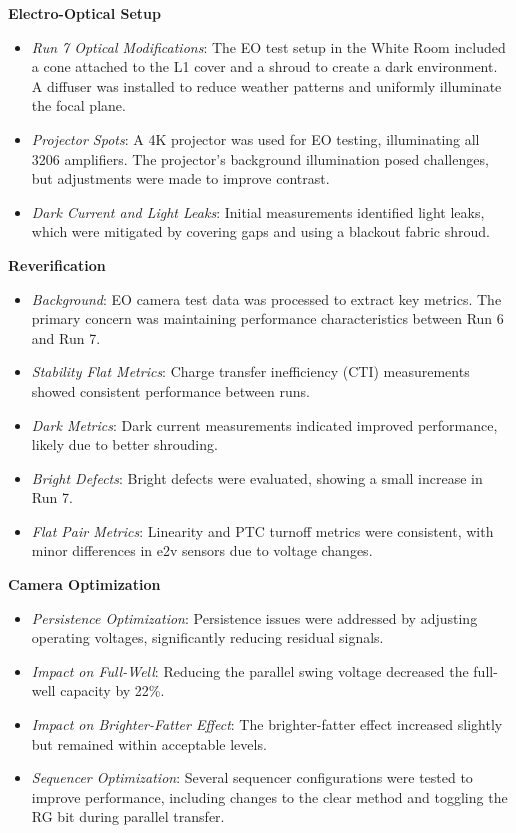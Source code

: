 \textbf{Electro-Optical Setup} \\
\begin{itemize}
    \item \textit{Run 7 Optical Modifications}: The EO test setup in the White Room included a cone attached to the L1 cover and a shroud to create a dark environment. A diffuser was installed to reduce weather patterns and uniformly illuminate the focal plane.
    \item \textit{Projector Spots}: A 4K projector was used for EO testing, illuminating all 3206 amplifiers. The projector's background illumination posed challenges, but adjustments were made to improve contrast.
    \item \textit{Dark Current and Light Leaks}: Initial measurements identified light leaks, which were mitigated by covering gaps and using a blackout fabric shroud.
\end{itemize}

\textbf{Reverification} \\
\begin{itemize}
    \item \textit{Background}: EO camera test data was processed to extract key metrics. The primary concern was maintaining performance characteristics between Run 6 and Run 7.
    \item \textit{Stability Flat Metrics}: Charge transfer inefficiency (CTI) measurements showed consistent performance between runs.
    \item \textit{Dark Metrics}: Dark current measurements indicated improved performance, likely due to better shrouding.
    \item \textit{Bright Defects}: Bright defects were evaluated, showing a small increase in Run 7.
    \item \textit{Flat Pair Metrics}: Linearity and PTC turnoff metrics were consistent, with minor differences in e2v sensors due to voltage changes.
\end{itemize}

\textbf{Camera Optimization} \\
\begin{itemize}
    \item \textit{Persistence Optimization}: Persistence issues were addressed by adjusting operating voltages, significantly reducing residual signals.
    \item \textit{Impact on Full-Well}: Reducing the parallel swing voltage decreased the full-well capacity by 22\%.
    \item \textit{Impact on Brighter-Fatter Effect}: The brighter-fatter effect increased slightly but remained within acceptable levels.
    \item \textit{Sequencer Optimization}: Several sequencer configurations were tested to improve performance, including changes to the clear method and toggling the RG bit during parallel transfer.
\end{itemize}

